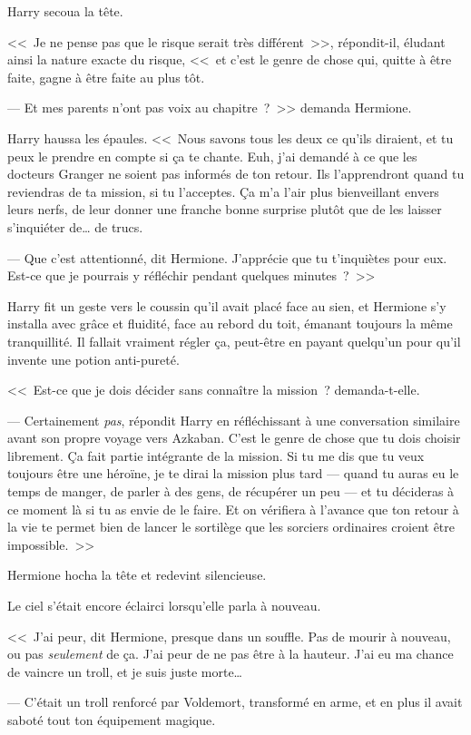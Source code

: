 Harry secoua la tête.

<<~Je ne pense pas que le risque serait très différent~>>, répondit-il, éludant ainsi la nature exacte du risque, <<~et c'est le genre de chose qui, quitte à être faite, gagne à être faite au plus tôt.

--- Et mes parents n'ont pas voix au chapitre~?~>> demanda Hermione.

Harry haussa les épaules. <<~Nous savons tous les deux ce qu'ils diraient, et tu peux le prendre en compte si ça te chante. Euh, j'ai demandé à ce que les docteurs Granger ne soient pas informés de ton retour. Ils l'apprendront quand tu reviendras de ta mission, si tu l'acceptes. Ça m'a l'air plus bienveillant envers leurs nerfs, de leur donner une franche bonne surprise plutôt que de les laisser s'inquiéter de… de trucs.

--- Que c'est attentionné, dit Hermione. J'apprécie que tu t'inquiètes pour eux. Est-ce que je pourrais y réfléchir pendant quelques minutes~?~>>

Harry fit un geste vers le coussin qu'il avait placé face au sien, et Hermione s'y installa avec grâce et fluidité, face au rebord du toit, émanant toujours la même tranquillité. Il fallait vraiment régler ça, peut-être en payant quelqu'un pour qu'il invente une potion anti-pureté.

<<~Est-ce que je dois décider sans connaître la mission~? demanda-t-elle.

--- Certainement \emph{pas}, répondit Harry en réfléchissant à une conversation similaire avant son propre voyage vers Azkaban. C'est le genre de chose que tu dois choisir librement. Ça fait partie intégrante de la mission. Si tu me dis que tu veux toujours être une héroïne, je te dirai la mission plus tard — quand tu auras eu le temps de manger, de parler à des gens, de récupérer un peu — et tu décideras à ce moment là si tu as envie de le faire. Et on vérifiera à l'avance que ton retour à la vie te permet bien de lancer le sortilège que les sorciers ordinaires croient être impossible.~>>

Hermione hocha la tête et redevint silencieuse.

Le ciel s'était encore éclairci lorsqu'elle parla à nouveau.

<<~J'ai peur, dit Hermione, presque dans un souffle. Pas de mourir à nouveau, ou pas \emph{seulement} de ça. J'ai peur de ne pas être à la hauteur. J'ai eu ma chance de vaincre un troll, et je suis juste morte…

--- C'était un troll renforcé par Voldemort, transformé en arme, et en plus il avait saboté tout ton équipement magique.

